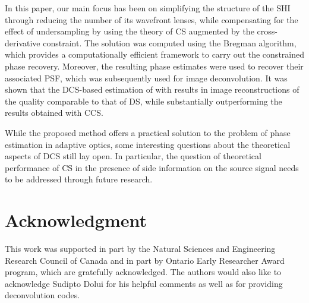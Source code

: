 \pdfoutput=1 \documentclass[journal]{IEEEtran}
\begin{document}
In this paper, our main focus has been on simplifying the structure of the SHI through reducing the number of its wavefront lenses, while compensating for the effect of undersampling by using the theory of CS augmented by the cross-derivative constraint. The solution was computed using the Bregman algorithm, which provides a computationally efficient framework to carry out the constrained phase recovery. Moreover, the resulting phase estimates were used to recover their associated PSF, which was subsequently used for image deconvolution. It was shown that the DCS-based estimation of  with  results in image reconstructions of the quality comparable to that of DS, while substantially outperforming the results obtained with CCS.

While the proposed method offers a practical solution to the problem of phase estimation in adaptive optics, some interesting questions about the theoretical aspects of DCS still lay open. In particular, the question of theoretical performance of CS in the presence of side information on the source signal needs to be addressed through future research.

\section*{Acknowledgment}
This work was supported in part by the Natural Sciences and Engineering Research Council of Canada and in part by Ontario Early Researcher Award program, which are gratefully acknowledged. The authors would also like to acknowledge Sudipto Dolui for his helpful comments as well as for providing deconvolution codes.



\end{document}
